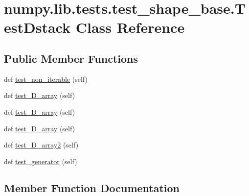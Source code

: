 \hypertarget{classnumpy_1_1lib_1_1tests_1_1test__shape__base_1_1TestDstack}{}\section{numpy.\+lib.\+tests.\+test\+\_\+shape\+\_\+base.\+Test\+Dstack Class Reference}
\label{classnumpy_1_1lib_1_1tests_1_1test__shape__base_1_1TestDstack}
\subsection*{Public Member Functions}
\begin{DoxyCompactItemize}
\item 
def \hyperlink{classnumpy_1_1lib_1_1tests_1_1test__shape__base_1_1TestDstack_ae2ad41eb81272246af0afa433c28d44b}{test\+\_\+non\+\_\+iterable} (self)
\item 
def \hyperlink{classnumpy_1_1lib_1_1tests_1_1test__shape__base_1_1TestDstack_a775933c048809325c5a0316700538de9}{test\+\_\+D\+\_\+array} (self)
\item 
def \hyperlink{classnumpy_1_1lib_1_1tests_1_1test__shape__base_1_1TestDstack_a538e1d43f6a4fbb0c34c9d5e6fc99fdf}{test\+\_\+D\+\_\+array} (self)
\item 
def \hyperlink{classnumpy_1_1lib_1_1tests_1_1test__shape__base_1_1TestDstack_af46d9ffd16bfa192729fddaadf9ba03a}{test\+\_\+D\+\_\+array} (self)
\item 
def \hyperlink{classnumpy_1_1lib_1_1tests_1_1test__shape__base_1_1TestDstack_ab722eea8d28bf0e8808ae0f670eeb382}{test\+\_\+D\+\_\+array2} (self)
\item 
def \hyperlink{classnumpy_1_1lib_1_1tests_1_1test__shape__base_1_1TestDstack_a34cbc3c2890e08e040a7e9904a61338e}{test\+\_\+generator} (self)
\end{DoxyCompactItemize}


\subsection{Member Function Documentation}
\mbox{\label{classnumpy_1_1lib_1_1tests_1_1test__shape__base_1_1TestDstack_a775933c048809325c5a0316700538de9}} 
